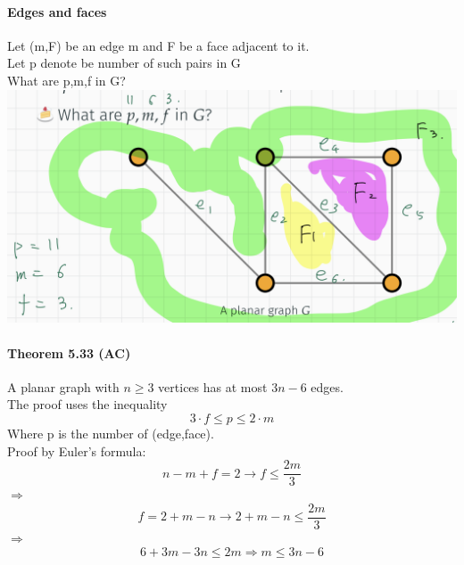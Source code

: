 \documentclass{article}
\begin{document}
\paragraph{Edges and faces}
Let (m,F) be an edge m and F be a face adjacent to it.\\
Let p denote be number of such pairs in G\\
What are p,m,f in G?\\
\includegraphics{0104}
\paragraph{Theorem 5.33 (AC)}
A planar graph with $n\ge 3$ vertices has at most $3n-6$ edges.\\
The proof uses the inequality\\
$$3\cdot f\leq p \leq 2\cdot m$$
Where p is the number of (edge,face).\\
Proof by Euler's formula:
$$n-m+f=2\longrightarrow f\leq \frac{2m}{3}$$
$\Longrightarrow$
$$f=2+m-n\longrightarrow 2+m-n\leq \frac{2m}{3}$$
$\Longrightarrow$
$$6+3m-3n\leq 2m\Longrightarrow m\leq 3n-6$$
\end{document}
